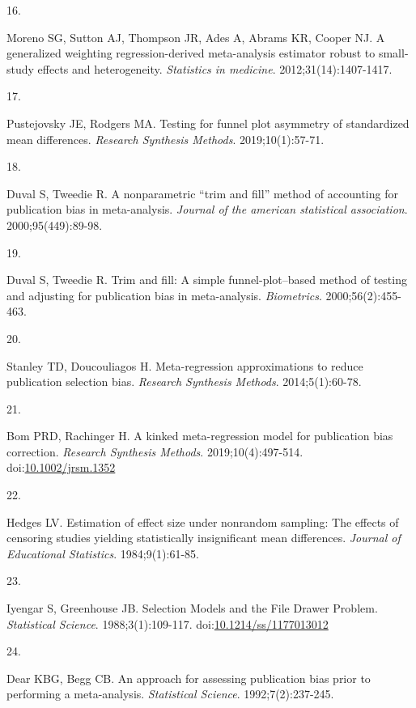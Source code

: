 \documentclass[
  american,
  man, donotrepeattitle,floatsintext]{apa7}
\newlength{\cslhangindent}
\newlength{\csllabelwidth}
\newenvironment{CSLReferences}[2] %
 {\begin{list}{}{%
  \setlength{\itemindent}{0pt}
  \setlength{\leftmargin}{0pt}
  \setlength{\parsep}{0pt}
  \ifodd #1
   \setlength{\leftmargin}{\cslhangindent}
   \setlength{\itemindent}{-1\cslhangindent}
  \fi
  \setlength{\itemsep}{#2\baselineskip}}}
 {\end{list}}
\newcommand{\CSLLeftMargin}[1]{\parbox[t]{\csllabelwidth}{\strut#1\strut}}
\newcommand{\CSLRightInline}[1]{\parbox[t]{\linewidth - \csllabelwidth}{\strut#1\strut}}
\begin{document}
\begin{CSLReferences}{0}{1}
\CSLLeftMargin{16. }%
\CSLRightInline{Moreno SG, Sutton AJ, Thompson JR, Ades A, Abrams KR, Cooper NJ. A generalized weighting regression-derived meta-analysis estimator robust to small-study effects and heterogeneity. \emph{Statistics in medicine}. 2012;31(14):1407-1417.}

\CSLLeftMargin{17. }%
\CSLRightInline{Pustejovsky JE, Rodgers MA. Testing for funnel plot asymmetry of standardized mean differences. \emph{Research Synthesis Methods}. 2019;10(1):57-71.}

\CSLLeftMargin{18. }%
\CSLRightInline{Duval S, Tweedie R. A nonparametric {``trim and fill''} method of accounting for publication bias in meta-analysis. \emph{Journal of the american statistical association}. 2000;95(449):89-98.}

\CSLLeftMargin{19. }%
\CSLRightInline{Duval S, Tweedie R. Trim and fill: A simple funnel-plot--based method of testing and adjusting for publication bias in meta-analysis. \emph{Biometrics}. 2000;56(2):455-463.}

\CSLLeftMargin{20. }%
\CSLRightInline{Stanley TD, Doucouliagos H. Meta-regression approximations to reduce publication selection bias. \emph{Research Synthesis Methods}. 2014;5(1):60-78.}

\CSLLeftMargin{21. }%
\CSLRightInline{Bom PRD, Rachinger H. A kinked meta-regression model for publication bias correction. \emph{Research Synthesis Methods}. 2019;10(4):497-514. doi:\href{https://doi.org/10.1002/jrsm.1352}{10.1002/jrsm.1352}}

\CSLLeftMargin{22. }%
\CSLRightInline{Hedges LV. Estimation of effect size under nonrandom sampling: The effects of censoring studies yielding statistically insignificant mean differences. \emph{Journal of Educational Statistics}. 1984;9(1):61-85.}

\CSLLeftMargin{23. }%
\CSLRightInline{Iyengar S, Greenhouse JB. Selection {Models} and the {File} {Drawer} {Problem}. \emph{Statistical Science}. 1988;3(1):109-117. doi:\href{https://doi.org/10.1214/ss/1177013012}{10.1214/ss/1177013012}}

\CSLLeftMargin{24. }%
\CSLRightInline{Dear KBG, Begg CB. {An approach for assessing publication bias prior to performing a meta-analysis}. \emph{Statistical Science}. 1992;7(2):237-245.}


\end{CSLReferences}
\end{document}
